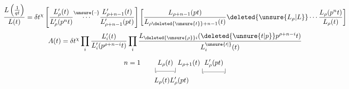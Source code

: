 
\[
\frac{L\left(\frac{1}{qt}\right)}{L(t)}=\delta t^\chi
\left[\frac{L'_\rho(t)}{L'_\rho(p^nt)}\overset{\unsure{\text{--}}}{\cdots}
\frac{L'_{\rho+n-1}(t)}{L'_{\rho+n-1}(pt)}\right]
\left[\frac{L_{\rho+n-1}(pt)}{L_{\rho\deleted{\unsure{t}}+n-1}(t)}
\deleted{\unsure{L_\rho|L}}\cdots
\frac{L_\rho(p^nt)}{L_\rho(t)}\right]
\]
\[
A(t)=\delta t^\chi\prod_i\frac{L'_i(t)}{L'_i(p^{\rho+n-i}t)}
\prod_i\frac{L_{\deleted{\unsure{\rho}}i}(\deleted{\unsure{t|p}}p^{\rho+n-i}t)}{L_i^{\unsure{\prime|{}}}(t)}
\]

\[
\begin{aligned}
n=1\qquad &\underset{\lfloor\!\rule{2.8em}{.3pt}\!\rfloor}{L_\rho(t)}\,L_{\rho+1}(t)\,\underset{\lfloor\!\rule{3.2em}{.3pt}\!\rfloor}{L'_\rho(pt)}\\
&L_\rho(t)L'_\rho(pt)
\end{aligned}
\]
